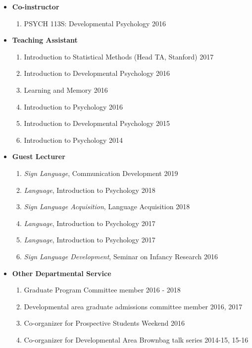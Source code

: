 \documentclass[10pt]{article}
\newenvironment{outerlist}[1][\enskip\textbullet]%
        {\begin{itemize}[#1,leftmargin=*]}{\end{itemize}%
         \vspace{-.6\baselineskip}}
\begin{document}
\begin{outerlist}

\item[] \textbf{Co-instructor}

\begin{enumerate}
        \item PSYCH 113S: Developmental Psychology \hfill 2016
\end{enumerate}

\item[] \textbf{Teaching Assistant}

\begin{enumerate}[resume]
        \item Introduction to Statistical Methods (Head TA, Stanford) \hfill 2017
        \item Introduction to Developmental Psychology \hfill 2016
        \item Learning and Memory \hfill 2016
        \item Introduction to Psychology \hfill 2016
        \item Introduction to Developmental Psychology \hfill 2015
        \item Introduction to Psychology \hfill 2014
\end{enumerate}

\item[] \textbf{Guest Lecturer}

\begin{enumerate}[resume]
        \item \emph{Sign Language}, Communication Development \hfill 2019
        \item \emph{Language}, Introduction to Psychology \hfill 2018
        \item \emph{Sign Language Acquisition}, Language Acquisition \hfill 2018
        \item \emph{Language}, Introduction to Psychology \hfill 2017
        \item \emph{Language}, Introduction to Psychology \hfill 2017
        \item \emph{Sign Language Development}, Seminar on Infancy Research \hfill 2016
\end{enumerate}

\item[] \textbf{Other Departmental Service}

\begin{enumerate}[resume]
        \item Graduate Program Committee member \hfill 2016 - 2018
        \item Developmental area graduate admissions committee member \hfill 2016, 2017
        \item Co-organizer for Prospective Students Weekend \hfill 2016
        \item Co-organizer for Developmental Area Brownbag talk series \hfill 2014-15, 15-16
\end{enumerate} 


\end{outerlist}
    
\end{document}
